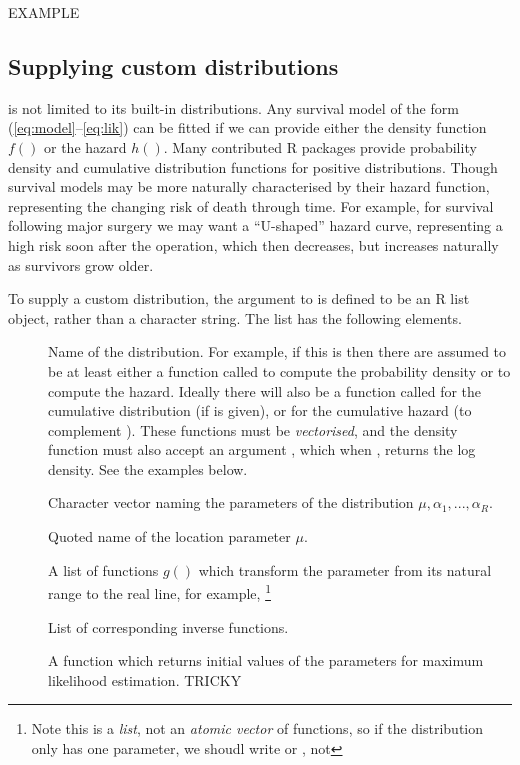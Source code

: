\documentclass[nojss,nofooter]{jss}
\begin{document}
EXAMPLE 



\subsection{Supplying custom distributions}

 is not limited to its built-in distributions.  Any
survival model of the form (\ref{eq:model}--\ref{eq:lik}) can be
fitted if we can provide either the density function $f()$ or the
hazard $h()$.  Many contributed R packages provide probability density
and cumulative distribution functions for positive distributions.  
Though survival models may be more naturally characterised by their
hazard function, representing the changing risk of death through time.
For example, for survival following major surgery we may want a
``U-shaped'' hazard curve, representing a high risk soon after the
operation, which then decreases, but increases naturally as survivors
grow older.

To supply a custom distribution, the  argument to
 is defined to be an R list object, rather than a
character string.  The list has the following elements.

\begin{description}
\item[] Name of the distribution.  For example, if this is  then there are assumed to be at least either a function called  to compute the probability density or  to compute the hazard.  Ideally there will also be a function called  for the cumulative distribution (if  is given), or  for the cumulative hazard (to complement ).   
  These functions must be \emph{vectorised}, and the density function
  must also accept an argument , which when ,
  returns the log density.   See the examples below. 
  
\item[] Character vector naming the parameters of the distribution $\mu,\alpha_1,...,\alpha_R$.
\item[] Quoted name of the location parameter $\mu$.
\item[] A list of functions $g()$ which transform the parameter from its natural range to the real line, for example,  \footnote{Note this is a \emph{list}, not an \emph{atomic vector} of functions, so if the distribution only has one parameter, we shoudl write  or , not }
\item[] List of corresponding inverse functions.
\item[] A function which returns initial values of the parameters for maximum likelihood estimation.    TRICKY
\end{description}
    
\end{document}
